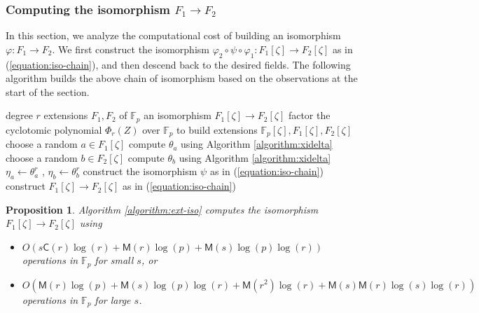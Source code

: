 \documentclass[12pt]{article}
\theoremstyle{plain}
\newtheorem{proposition}[theorem]{Proposition}
\theoremstyle{definition}
\def\F{\ensuremath{\mathbb{F}}}
\def\MM{\ensuremath{\mathsf{M}}}
\def\CC{\ensuremath{\mathsf{C}}}
\newcounter{algorithm}
\begin{document}

\subsubsection{Computing the isomorphism $F_1 \rightarrow F_2$}

In this section, we analyze the computational cost of building an isomorphism $\varphi: F_1 
\rightarrow F_2$. We first construct the isomorphism $\varphi_2 \circ \psi \circ \varphi_1 : 
F_1[\zeta] \rightarrow F_2[\zeta]$ as in (\ref{equation:iso-chain}), and then descend back to the 
desired fields. The following algorithm builds the above chain of isomorphism based on the 
observations at the start of the section. 
\begin{algorithm}
	\label{algorithm:ext-iso}
	\begin{algorithmic}[1]
		\REQUIRE degree $r$ extensions $F_1, F_2$ of $\F_p$
		\ENSURE an isomorphism $F_1[\zeta] \rightarrow F_2[\zeta]$
		\STATE\label{step:factor-cyclo} factor the cyclotomic polynomial $\Phi_r(Z)$ over $\F_p$ to 
		build extensions $\F_p[\zeta],
		F_1[\zeta], F_2[\zeta]$
		\REPEAT
		\STATE choose a random $a \in F_1[\zeta]$
		\STATE compute $\theta_a$ using Algorithm \ref{algorithm:xidelta}
		\REPEAT
		\STATE choose a random $b \in F_2[\zeta]$
		\STATE compute $\theta_b$ using Algorithm \ref{algorithm:xidelta}
		\STATE\label{step:gamma-pow} $\eta_a \leftarrow \theta_a^r$ , $\eta_b \leftarrow \theta_b^r$
		\STATE\label{step:psi} construct the isomorphism $\psi$ as in (\ref{equation:iso-chain})
		\STATE construct $F_1[\zeta] \rightarrow F_2[\zeta]$ as in (\ref{equation:iso-chain})
	\end{algorithmic}
\end{algorithm}
\begin{proposition}
	Algorithm \ref{algorithm:ext-iso} computes the isomorphism $F_1[\zeta] \rightarrow F_2[\zeta]$ 
	using
	\begin{itemize}
		\item $O(s\CC(r)\log(r) + \MM(r)\log(p) + \MM(s)\log(p)\log(r))$\\ operations in $\F_p$ for 
		small $s$, or
		\item $O(\MM(r)\log(p) + \MM(s)\log(p)\log(r) + \MM(r^2)\log(r) + 
		\MM(s)\MM(r)\log(s)\log(r))$\\ 
		operations in $\F_p$ for large $s$.
	\end{itemize}
\end{proposition}
\end{document}
